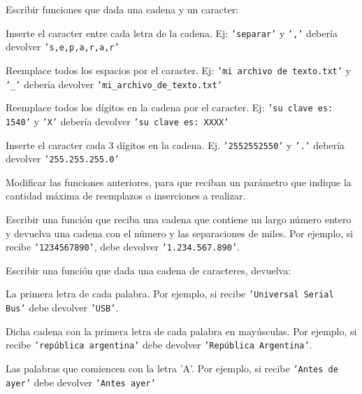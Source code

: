 \begin{ejercicio}
Escribir funciones que dada una cadena y un caracter:
\begin{partes}
\item Inserte el caracter entre cada letra de la cadena. Ej: \texttt{'separar'}
y \texttt{','} debería devolver \texttt{'s,e,p,a,r,a,r'}
\item Reemplace todos los espacios por el caracter. Ej: \texttt{'mi archivo de
texto.txt'} y \texttt{'\_'} debería devolver
\texttt{'mi\_archivo\_de\_texto.txt'}
\item Reemplace todos los dígitos en la cadena por el caracter. Ej: \texttt{'su
clave es: 1540'} y \texttt{'X'} debería devolver \texttt{'su clave es: XXXX'}
\item Inserte el caracter cada 3 dígitos en la cadena. Ej.
\texttt{'2552552550'} y \texttt{'.'} debería devolver \texttt{'255.255.255.0'}
\end{partes}
\end{ejercicio}


\begin{ejercicio}
Modificar las funciones anteriores, para que reciban un parámetro que indique
la cantidad máxima de reemplazos o inserciones a realizar.
\end{ejercicio}


\begin{ejercicio}
Escribir una función que reciba una cadena que contiene un largo número entero y
devuelva una cadena con el número y las separaciones de miles. Por ejemplo, si
recibe \texttt{'1234567890'}, debe devolver \texttt{'1.234.567.890'}.
\end{ejercicio}


\begin{ejercicio}
Escribir una función que dada una cadena de caracteres, devuelva:
\begin{partes}
\item La primera letra de cada palabra. Por ejemplo, si recibe
\texttt{'Universal Serial Bus'} debe devolver \texttt{'USB'}.
\item Dicha cadena con la primera letra de cada palabra en mayúsculas. Por
ejemplo, si recibe \texttt{'república argentina'} debe devolver
\texttt{'República Argentina'}.
\item Las palabras que comiencen con la letra 'A'. Por ejemplo, si recibe
\texttt{'Antes de ayer'} debe devolver \texttt{'Antes ayer'}
\end{partes}
\end{ejercicio}


